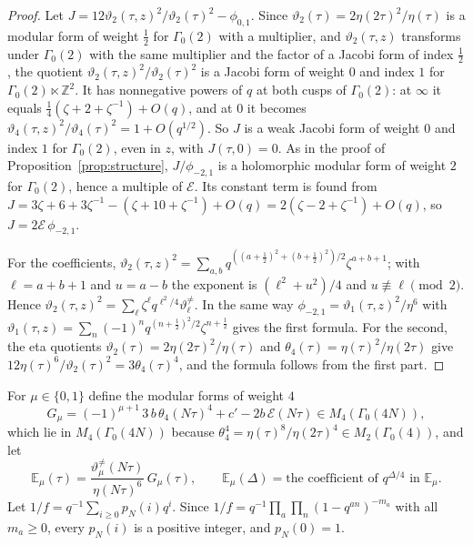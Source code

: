 \documentclass[11pt]{amsart}
\theoremstyle{definition}
\newcommand{\ZZ}{\mathbb{Z}}
\newcommand{\Ei}{\mathcal{E}}
\newcommand{\vtn}{\vartheta^{\neq}}
\begin{document}
\begin{proof}
Let $J=12\vartheta_2(\tau,z)^2/\vartheta_2(\tau)^2-\phi_{0,1}$. Since $\vartheta_2(\tau)=2\eta(2\tau)^2/\eta(\tau)$ is a modular form of weight $\frac12$ for $\Gamma_0(2)$ with a multiplier, and $\vartheta_2(\tau,z)$ transforms under $\Gamma_0(2)$ with the same multiplier and the factor of a Jacobi form of index $\frac12$, the quotient $\vartheta_2(\tau,z)^2/\vartheta_2(\tau)^2$ is a Jacobi form of weight $0$ and index $1$ for $\Gamma_0(2)\ltimes\ZZ^2$. It has nonnegative powers of $q$ at both cusps of $\Gamma_0(2)$: at $\infty$ it equals $\frac14(\zeta+2+\zeta^{-1})+O(q)$, and at $0$ it becomes $\vartheta_4(\tau,z)^2/\vartheta_4(\tau)^2=1+O(q^{1/2})$. So $J$ is a weak Jacobi form of weight $0$ and index $1$ for $\Gamma_0(2)$, even in $z$, with $J(\tau,0)=0$. As in the proof of Proposition~\ref{prop:structure}, $J/\phi_{-2,1}$ is a holomorphic modular form of weight $2$ for $\Gamma_0(2)$, hence a multiple of $\Ei$. Its constant term is found from $J=3\zeta+6+3\zeta^{-1}-(\zeta+10+\zeta^{-1})+O(q)=2(\zeta-2+\zeta^{-1})+O(q)$, so $J=2\Ei\,\phi_{-2,1}$.

For the coefficients, $\vartheta_2(\tau,z)^2=\sum_{a,b}q^{((a+\frac12)^2+(b+\frac12)^2)/2}\zeta^{a+b+1}$; with $\ell=a+b+1$ and $u=a-b$ the exponent is $(\ell^2+u^2)/4$ and $u\not\equiv\ell\pmod2$. Hence $\vartheta_2(\tau,z)^2=\sum_\ell\zeta^\ell q^{\ell^2/4}\vtn_\ell$. In the same way $\phi_{-2,1}=\vartheta_1(\tau,z)^2/\eta^6$ with $\vartheta_1(\tau,z)=\sum_n(-1)^nq^{(n+\frac12)^2/2}\zeta^{n+\frac12}$ gives the first formula. For the second, the eta quotients $\vartheta_2(\tau)=2\eta(2\tau)^2/\eta(\tau)$ and $\theta_4(\tau)=\eta(\tau)^2/\eta(2\tau)$ \cite{Ono04} give $12\eta(\tau)^6/\vartheta_2(\tau)^2=3\theta_4(\tau)^4$, and the formula follows from the first part.
\end{proof}

For $\mu\in\{0,1\}$ define the modular forms of weight $4$
\begin{equation}\label{eq:Gmu}
G_\mu=(-1)^{\mu+1}\,3\,b\,\theta_4(N\tau)^4+c'-2b\,\Ei(N\tau)\in M_4(\Gamma_0(4N)),
\end{equation}
which lie in $M_4(\Gamma_0(4N))$ because $\theta_4^4=\eta(\tau)^8/\eta(2\tau)^4\in M_2(\Gamma_0(4))$, and let
\[
\mathbb E_\mu(\tau)=\frac{\vtn_\mu(N\tau)}{\eta(N\tau)^6}\,G_\mu(\tau),\qquad \mathbb E_\mu(\Delta)=\text{the coefficient of }q^{\Delta/4}\text{ in }\mathbb E_\mu .
\]
Let $1/f=q^{-1}\sum_{i\ge0}p_N(i)q^i$. Since $1/f=q^{-1}\prod_a\prod_n(1-q^{an})^{-m_a}$ with all $m_a\ge0$, every $p_N(i)$ is a positive integer, and $p_N(0)=1$.
\end{document}
